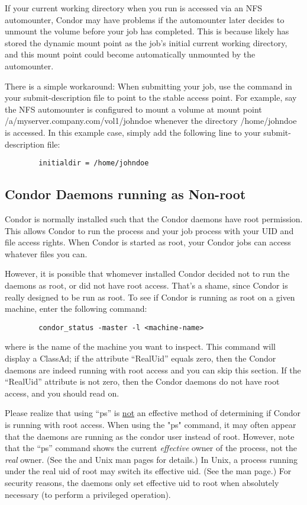 If your current working directory when you run  is
accessed via an NFS automounter, Condor may have problems if the
automounter later decides to unmount the volume before your job has
completed.  This is because  likely has stored the
dynamic mount point as the job's initial current working directory, and
this mount point could become automatically unmounted by the
automounter.

There is a simple workaround: When submitting your job, use the 
 command in your submit-description file to point to
the stable access point.  For example,
say the NFS automounter is configured to mount a volume at mount point
/a/myserver.company.com/vol1/johndoe whenever the directory /home/johndoe is
accessed.  In this example case, simply add the following line to your 
submit-description file:
\begin{verbatim}
        initialdir = /home/johndoe
\end{verbatim}

\subsection{Condor Daemons running as Non-root}

Condor is normally installed such that the Condor daemons have root
permission.  This allows Condor to run the  process and
your job process with your UID and file access rights.  When Condor
is started as root, your Condor jobs can access whatever files you can.

However, it is possible that whomever installed Condor decided not to
run the daemons as root, or did not have root access.  That's a shame, 
since Condor is really designed to be run as root.  To see if Condor is
running as root on a given machine, enter the following command:
\begin{verbatim}
        condor_status -master -l <machine-name>
\end{verbatim}

where  is the name of the machine you want to
inspect.  This command will display a  ClassAd; if the
attribute ``RealUid'' equals zero, then the Condor daemons are indeed
running with root access and you can skip this section.  If the
``RealUid'' attribute is not zero, then the Condor daemons do not have
root access, and you should read on.

Please realize that using ``ps'' is \underline{not} an effective
method of determining if Condor is running with root access.  When
using the "ps" command, it may often appear that the daemons are
running as the condor user instead of root.  However, note that the
``ps'' command shows the current \emph{effective} owner of the
process, not the \emph{real} owner.  (See the  and
 Unix man pages for details.)  In Unix, a process
running under the real uid of root may switch its effective uid.  (See
the  man page.)  For security reasons, the daemons
only set effective uid to root when absolutely necessary (to perform a
privileged operation).



